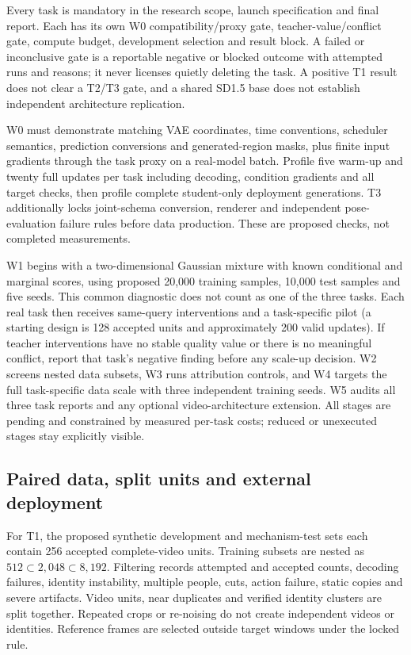 \documentclass{article}
\begin{document}
Every task is mandatory in the research scope, launch specification and final report. Each has its own W0 compatibility/proxy gate, teacher-value/conflict gate, compute budget, development selection and result block. A failed or inconclusive gate is a reportable negative or blocked outcome with attempted runs and reasons; it never licenses quietly deleting the task. A positive T1 result does not clear a T2/T3 gate, and a shared SD1.5 base does not establish independent architecture replication.

W0 must demonstrate matching VAE coordinates, time conventions, scheduler semantics, prediction conversions and generated-region masks, plus finite input gradients through the task proxy on a real-model batch. Profile five warm-up and twenty full updates per task including decoding, condition gradients and all target checks, then profile complete student-only deployment generations. T3 additionally locks joint-schema conversion, renderer and independent pose-evaluation failure rules before data production. These are proposed checks, not completed measurements.

W1 begins with a two-dimensional Gaussian mixture with known conditional and marginal scores, using proposed 20,000 training samples, 10,000 test samples and five seeds. This common diagnostic does not count as one of the three tasks. Each real task then receives same-query interventions and a task-specific pilot (a starting design is 128 accepted units and approximately 200 valid updates). If teacher interventions have no stable quality value or there is no meaningful conflict, report that task's negative finding before any scale-up decision. W2 screens nested data subsets, W3 runs attribution controls, and W4 targets the full task-specific data scale with three independent training seeds. W5 audits all three task reports and any optional video-architecture extension. All stages are pending and constrained by measured per-task costs; reduced or unexecuted stages stay explicitly visible.

\subsection{Paired data, split units and external deployment}
For T1, the proposed synthetic development and mechanism-test sets each contain 256 accepted complete-video units. Training subsets are nested as $512\subset2{,}048\subset8{,}192$. Filtering records attempted and accepted counts, decoding failures, identity instability, multiple people, cuts, action failure, static copies and severe artifacts. Video units, near duplicates and verified identity clusters are split together. Repeated crops or re-noising do not create independent videos or identities. Reference frames are selected outside target windows under the locked rule.
\end{document}
